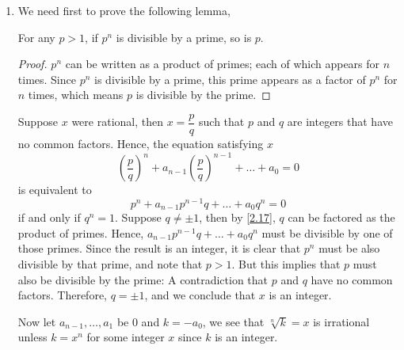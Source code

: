 \begin{solution} %
  \begin{enumerate}[label=(\alph*)]
    \item We need first to prove the following lemma,
    \begin{id}
      For any $p > 1$, if $p^n$ is divisible by a prime,
      so is $p$.
    \end{id}
    \renewcommand{\qedsymbol}{$\square$}
    \begin{proof}
      $p^n$ can be written as a product of primes; each
      of which appears for $n$ times. Since $p^n$
      is divisible by a prime, this prime appears as a factor
      of $p^n$ for $n$ times,
      which means $p$ is divisible by the prime.
    \end{proof}
    Suppose $x$ were rational, then $x = \dfrac{p}{q}$
    such that $p$ and $q$ are integers that have no common
    factors.
    Hence, the equation satisfying $x$
    \begin{equation*}
      \left(\frac{p}{q}\right)^n + a_{n-1}\left(\frac{p}{q}
      \right)^{n-1} +
      \dots + a_0 = 0
    \end{equation*}
    is equivalent to
    \begin{equation*}
      p^n + a_{n - 1}p^{n - 1}q + \dots + a_0q^n = 0
    \end{equation*}
    if and only if $q^n = 1$. Suppose $q \neq \pm1$, then
    by \autoref{2.17}, $q$ can be factored as the product
    of primes. Hence, $a_{n - 1}p^{n - 1}q + \dots + a_0q^n$
    must be divisible by one of those primes. Since the
    result is an integer, it is clear that $p^n$ must
    be also divisible by that prime, and note that $p > 1$.
    But this implies that $p$ must also be divisible
    by the prime: A contradiction that $p$ and $q$ have
    no common factors. Therefore, $q = \pm1$, and we
    conclude that $x$ is an integer.
    \par
    Now let $a_{n-1},\dots,a_1$ be $0$ and $k = -a_0$,
    we see that $\sqrt[n]{k} = x$ is irrational unless
    $k = x^n$ for some integer $x$ since $k$ is an integer.
  \end{enumerate}
\end{solution}
